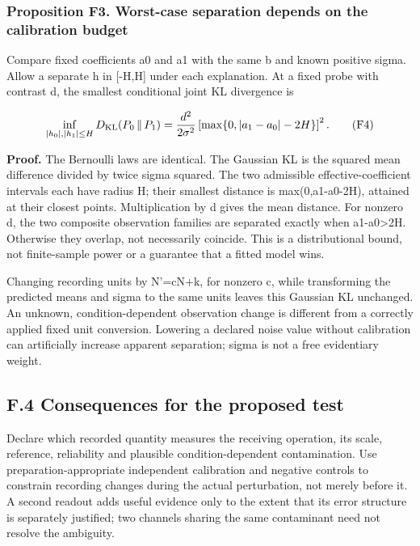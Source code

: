 \documentclass[
  american,
  11pt,
  letterpaper,
]{article}
\begin{document}
\subsubsection{Proposition F3. Worst-case separation depends on the calibration budget}\label{proposition-f3.-worst-case-separation-depends-on-the-calibration-budget}

Compare fixed coefficients a0 and a1 with the same b and known positive sigma. Allow a separate h in {[}-H,H{]} under each explanation. At a fixed probe with contrast d, the smallest conditional joint KL divergence is

\[
\inf_{|h_0|,|h_1|\leq H}
D_{\rm KL}(P_0\,\|\,P_1)
=\frac{d^2}{2\sigma^2}
\left[\max\{0,|a_1-a_0|-2H\}\right]^2.\tag{F4}
\]

\textbf{Proof.} The Bernoulli laws are identical. The Gaussian KL is the squared mean difference divided by twice sigma squared. The two admissible effective-coefficient intervals each have radius H; their smallest distance is max(0,\textbar a1-a0\textbar-2H), attained at their closest points. Multiplication by d gives the mean distance. For nonzero d, the two composite observation families are separated exactly when \textbar a1-a0\textbar\textgreater2H. Otherwise they overlap, not necessarily coincide. This is a distributional bound, not finite-sample power or a guarantee that a fitted model wins.

Changing recording units by N'=cN+k, for nonzero c, while transforming the predicted means and sigma to the same units leaves this Gaussian KL unchanged. An unknown, condition-dependent observation change is different from a correctly applied fixed unit conversion. Lowering a declared noise value without calibration can artificially increase apparent separation; sigma is not a free evidentiary weight.

\subsection{F.4 Consequences for the proposed test}\label{f.4-consequences-for-the-proposed-test}

Declare which recorded quantity measures the receiving operation, its scale, reference, reliability and plausible condition-dependent contamination. Use preparation-appropriate independent calibration and negative controls to constrain recording changes during the actual perturbation, not merely before it. A second readout adds useful evidence only to the extent that its error structure is separately justified; two channels sharing the same contaminant need not resolve the ambiguity.
\end{document}
